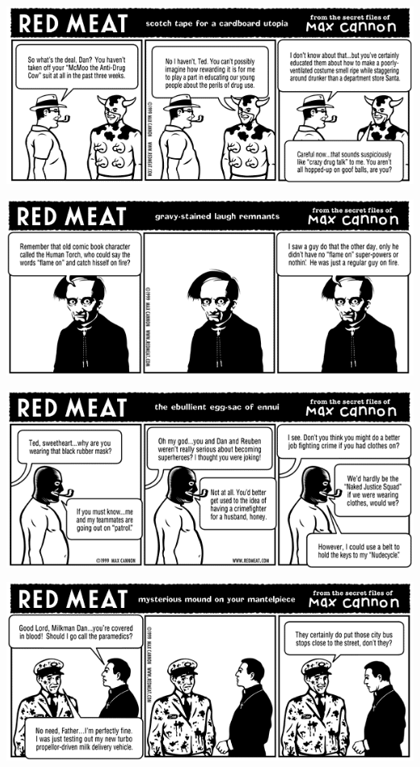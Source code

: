 \documentclass[a4paper,twoside,11pt]{article}
\begin{document}
\includegraphics[width=\textwidth]{redmeat_1999-08-02.png}



\includegraphics[width=\textwidth]{redmeat_1999-08-09.png}



\includegraphics[width=\textwidth]{redmeat_1999-08-16.png}



\includegraphics[width=\textwidth]{redmeat_1999-08-23.png}
\end{document}
